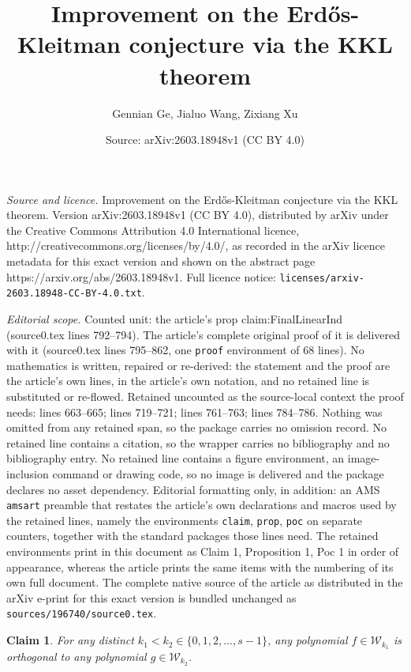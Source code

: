\documentclass[10pt,a4paper]{amsart}
\title{Improvement on the Erd\H{o}s-Kleitman conjecture via the KKL theorem}
\author{Gennian Ge, Jialuo Wang, Zixiang Xu}
\date{Source: arXiv:2603.18948v1 (CC BY 4.0)}
\newtheorem{claim}{Claim}
\begin{document}
\maketitle

\noindent\emph{Source and licence.} Improvement on the Erd\H{o}s-Kleitman conjecture via the KKL theorem. Version arXiv:2603.18948v1 (CC BY 4.0), distributed by arXiv under the Creative Commons Attribution 4.0 International licence, http://creativecommons.org/licenses/by/4.0/, as recorded in the arXiv licence metadata for this exact version and shown on the abstract page https://arxiv.org/abs/2603.18948v1. Full licence notice: \texttt{licenses/arxiv-2603.18948-CC-BY-4.0.txt}.\par\smallskip

\noindent\textit{Editorial scope.} Counted unit: the article's prop claim:FinalLinearInd (source0.tex lines 792--794). The article's complete original proof of it is delivered with it (source0.tex lines 795--862, one \texttt{proof} environment of 68 lines). No mathematics is written, repaired or re-derived: the statement and the proof are the article's own lines, in the article's own notation, and no retained line is substituted or re-flowed.  Retained uncounted as the source-local context the proof needs: lines 663--665; lines 719--721; lines 761--763; lines 784--786.  Nothing was omitted from any retained span, so the package carries no omission record.  No retained line contains a citation, so the wrapper carries no bibliography and no bibliography entry.  No retained line contains a figure environment, an image-inclusion command or drawing code, so no image is delivered and the package declares no asset dependency.  Editorial formatting only, in addition: an AMS \texttt{amsart} preamble that restates the article's own declarations and macros used by the retained lines, namely the environments \texttt{claim}, \texttt{prop}, \texttt{poc} on separate counters, together with the standard packages those lines need.  The retained environments print in this document as Claim 1, Proposition 1, Poc 1 in order of appearance, whereas the article prints the same items with the numbering of its own full document.  The complete native source of the article as distributed in the arXiv e-print for this exact version is bundled unchanged as \texttt{sources/196740/source0.tex}.
\begin{claim}\label{claim:orthogonal of distinct w_k}
    For any distinct \(k_{1}<k_{2}\in\{0,1,2,\ldots,s-1\}\), any polynomial \(f\in\mathcal{W}_{k_{1}}\) is orthogonal to any polynomial \(g\in\mathcal{W}_{k_{2}}\).
\end{claim}
\end{document}
